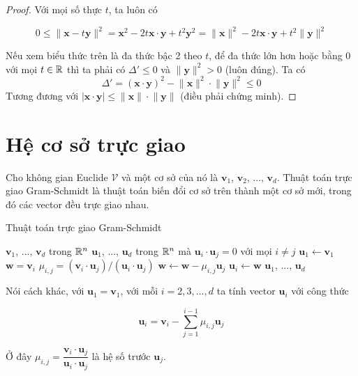 \begin{proof}
	Với mọi số thực $t$, ta luôn có 
	
	\[0 \leq \lVert \bm{x} - t \bm{y} \rVert^2 = \bm{x}^2 - 2 t \bm{x} \cdot \bm{y} + t^2 \bm{y}^2 = \lVert \bm{x} \rVert^2 - 2 t \bm{x} \cdot \bm{y} + t^2 \lVert \bm{y} \rVert^2 \]
	
	Nếu xem biểu thức trên là đa thức bậc 2 theo $t$, để đa thức lớn hơn hoặc bằng 0 với mọi $t \in \mathbb{R}$ thì ta phải có $\Delta' \leq 0$ và $\lVert \bm{y} \rVert^2 > 0$ (luôn đúng). Ta có
	\[\Delta' = (\bm{x} \cdot \bm{y})^2 - \lVert \bm{x} \rVert^2 \cdot \lVert \bm{y} \rVert^2 \leq 0 \]
	Tương đương với $\lvert \bm{x} \cdot \bm{y} \rvert \leq \lVert \bm{x} \rVert \cdot \lVert \bm{y} \rVert$ (điều phải chứng minh).
\end{proof}

\section{Hệ cơ sở trực giao}

Cho không gian Euclide $\mathcal{V}$ và một cơ sở của nó là $\bm{v}_1$, $\bm{v}_2$, ..., $\bm{v}_d$. Thuật toán trực giao Gram-Schmidt là thuật toán biến đổi cơ sở trên thành một cơ sở mới, trong đó các vector đều trực giao nhau.

\begin{algorithm}
	\caption{Thuật toán trực giao Gram-Schmidt}
	\begin{algorithmic}
		\Require $\bm{v}_1$, ..., $\bm{v}_d$ trong $\mathbb{R}^n$
		\Ensure $\bm{u}_1$, ..., $\bm{u}_d$ trong $\mathbb{R}^n$ mà $\bm{u}_i \cdot \bm{u}_j = 0$ với mọi $i \neq j$
		\State $\bm{u}_1 \gets \bm{v}_1$
			\State $\bm{w} = \bm{v}_i$
			\State $\mu_{i,j} = (\bm{v}_i \cdot \bm{u}_j) / (\bm{u}_i \cdot \bm{u}_j)$
			\State $\bm{w} \gets \bm{w} - \mu_{i, j} \bm{u}_j$
			\EndFor
			\State $\bm{u}_i \gets \bm{w}$
		\EndFor
		\State \Return $\bm{u}_1$, ..., $\bm{u}_d$
	\end{algorithmic}
\end{algorithm}

Nói cách khác, với $\bm{u}_1 = \bm{v}_1$, với mỗi $i = 2, 3, \ldots, d$ ta tính vector $\bm{u}_i$ với công thức

\begin{equation}
	\bm{u}_i = \bm{v}_i - \sum_{j=1}^{i-1} \mu_{i,j} \bm{u}_j
\end{equation}

Ở đây $\mu_{i,j} = \dfrac{\bm{v}_i \cdot \bm{u}_j}{\bm{u}_i \cdot \bm{u}_j}$ là hệ số trước $\bm{u}_j$.

